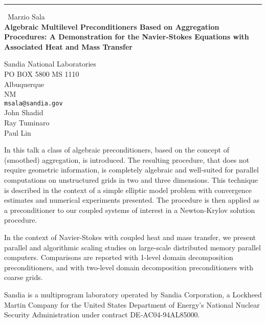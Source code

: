 \documentclass{report}
\begin{document}
\begin{center}
\rule{6in}{1pt} \
{\large Marzio Sala \\
{\bf Algebraic Multilevel Preconditioners Based on Aggregation Procedures: A Demonstration for the Navier-Stokes Equations with Associated Heat and Mass Transfer}}

Sandia National Laboratories \\ PO BOX 5800 MS 1110 \\ Albuquerque \\ NM
\\
{\tt msala@sandia.gov}\\
John Shadid\\
Ray Tuminaro\\
	Paul Lin\end{center}

In this talk a class of algebraic preconditioners, based on the concept
of (smoothed) aggregation, is introduced. The resulting
procedure, that does not require geometric information, is completely
algebraic and well-suited for parallel computations on unstructured grids
in two and three dimensions. This technique is described in the context
of a simple elliptic model problem with convergence estimates and
numerical experiments presented. The procedure is then applied as a
preconditioner to our coupled systems of interest in a Newton-Krylov
solution procedure.

In the context of Navier-Stokes with coupled heat and mass transfer, we
present parallel and algorithmic scaling studies on large-scale
distributed memory parallel computers. Comparisons are reported with
1-level domain decomposition preconditioners, and with two-level domain
decomposition preconditioners with coarse grids.

Sandia is a multiprogram laboratory operated by Sandia Corporation, a
Lockheed Martin Company for the United States Department of Energy's
National Nuclear Security Administration under contract
DE-AC04-94AL85000.
\end{document}
